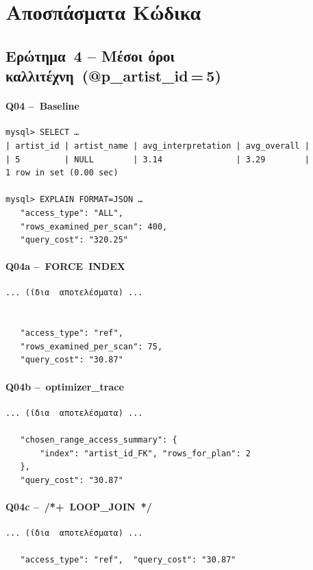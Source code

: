 \documentclass[a4paper,12pt]{article}
\begin{document}
\section{Αποσπάσματα Κώδικα}

\subsection*{Ερώτημα 4 – Μέσοι όροι καλλιτέχνη (@p\_artist\_id = 5)}

\paragraph{Q04  – Baseline}
\begin{lstlisting}
mysql> SELECT …
| artist_id | artist_name | avg_interpretation | avg_overall |
| 5         | NULL        | 3.14               | 3.29        |
1 row in set (0.00 sec)

mysql> EXPLAIN FORMAT=JSON …
   "access_type": "ALL",
   "rows_examined_per_scan": 400,
   "query_cost": "320.25"
\end{lstlisting}

\paragraph{Q04a – FORCE INDEX}
\begin{lstlisting}
... (ίδια  αποτελέσματα) ...


   "access_type": "ref",
   "rows_examined_per_scan": 75,
   "query_cost": "30.87"
\end{lstlisting}

\paragraph{Q04b – optimizer\_trace}
\begin{lstlisting}
... (ίδια  αποτελέσματα) ...

   "chosen_range_access_summary": {
       "index": "artist_id_FK", "rows_for_plan": 2
   },
   "query_cost": "30.87"
\end{lstlisting}

\paragraph{Q04c – /*+ LOOP\_JOIN */}
\begin{lstlisting}
... (ίδια  αποτελέσματα) ...

   "access_type": "ref",  "query_cost": "30.87"
\end{lstlisting}
\end{document}
